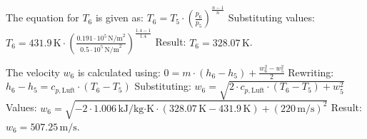 The equation for \( T_6 \) is given as:  
\( T_6 = T_5 \cdot \left( \frac{p_6}{p_5} \right)^{\frac{n-1}{n}} \)  
Substituting values:  
\( T_6 = 431.9 \, \text{K} \cdot \left( \frac{0.191 \cdot 10^5 \, \text{N/m}^2}{0.5 \cdot 10^5 \, \text{N/m}^2} \right)^{\frac{1.4-1}{1.4}} \)  
Result: \( T_6 = 328.07 \, \text{K} \).  

The velocity \( w_6 \) is calculated using:  
\( 0 = m \cdot (h_6 - h_5) + \frac{w_6^2 - w_5^2}{2} \)  
Rewriting:  
\( h_6 - h_5 = c_{p,\text{Luft}} \cdot (T_6 - T_5) \)  
Substituting:  
\( w_6 = \sqrt{2 \cdot c_{p,\text{Luft}} \cdot (T_6 - T_5) + w_5^2} \)  
Values:  
\( w_6 = \sqrt{-2 \cdot 1.006 \, \text{kJ/kg·K} \cdot (328.07 \, \text{K} - 431.9 \, \text{K}) + (220 \, \text{m/s})^2} \)  
Result: \( w_6 = 507.25 \, \text{m/s} \).